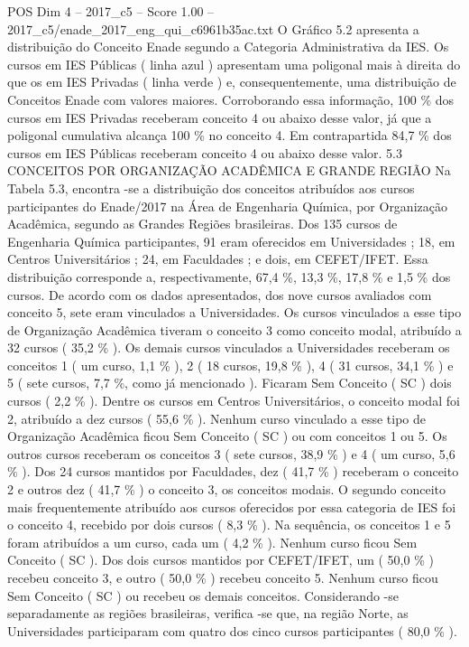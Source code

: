 \begin{textsample}{POS Dim 4 – 2017\_c5 – Score 1.00 – 2017\_c5/enade\_2017\_eng\_qui\_c6961b35ac.txt}
O Gráfico 5.2 apresenta a distribuição do Conceito Enade segundo a Categoria Administrativa da IES.
Os cursos em IES Públicas ( linha azul ) apresentam uma poligonal mais à direita do que os em IES Privadas ( linha verde ) e, consequentemente, uma distribuição de Conceitos Enade com valores maiores.
Corroborando essa informação, 100 \% dos cursos em IES Privadas receberam conceito 4 ou abaixo desse valor, já que a poligonal cumulativa alcança 100 \% no conceito 4.
Em contrapartida 84,7 \% dos cursos em IES Públicas receberam conceito 4 ou abaixo desse valor. 5.3 CONCEITOS POR ORGANIZAÇÃO ACADÊMICA E GRANDE REGIÃO Na Tabela 5.3, encontra -se a distribuição dos conceitos atribuídos aos cursos participantes do Enade/2017 na Área de Engenharia Química, por Organização Acadêmica, segundo as Grandes Regiões brasileiras.
Dos 135 cursos de Engenharia Química participantes, 91 eram oferecidos em Universidades ; 18, em Centros Universitários ; 24, em Faculdades ; e dois, em CEFET/IFET.
Essa distribuição corresponde a, respectivamente, 67,4 \%, 13,3 \%, 17,8 \% e 1,5 \% dos cursos.
De acordo com os dados apresentados, dos nove cursos avaliados com conceito 5, sete eram vinculados a Universidades.
Os cursos vinculados a esse tipo de Organização Acadêmica tiveram o conceito 3 como conceito modal, atribuído a 32 cursos ( 35,2 \% ).
Os demais cursos vinculados a Universidades receberam os conceitos 1 ( um curso, 1,1 \% ), 2 ( 18 cursos, 19,8 \% ), 4 ( 31 cursos, 34,1 \% ) e 5 ( sete cursos, 7,7 \%, como já mencionado ).
Ficaram Sem Conceito ( SC ) dois cursos ( 2,2 \% ).
Dentre os cursos em Centros Universitários, o conceito modal foi 2, atribuído a dez cursos ( 55,6 \% ).
Nenhum curso vinculado a esse tipo de Organização Acadêmica ficou Sem Conceito ( SC ) ou com conceitos 1 ou 5.
Os outros cursos receberam os conceitos 3 ( sete cursos, 38,9 \% ) e 4 ( um curso, 5,6 \% ).
Dos 24 cursos mantidos por Faculdades, dez ( 41,7 \% ) receberam o conceito 2 e outros dez ( 41,7 \% ) o conceito 3, os conceitos modais.
O segundo conceito mais frequentemente atribuído aos cursos oferecidos por essa categoria de IES foi o conceito 4, recebido por dois cursos ( 8,3 \% ).
Na sequência, os conceitos 1 e 5 foram atribuídos a um curso, cada um ( 4,2 \% ).
Nenhum curso ficou Sem Conceito ( SC ).
Dos dois cursos mantidos por CEFET/IFET, um ( 50,0 \% ) recebeu conceito 3, e outro ( 50,0 \% ) recebeu conceito 5.
Nenhum curso ficou Sem Conceito ( SC ) ou recebeu os demais conceitos.
Considerando -se separadamente as regiões brasileiras, verifica -se que, na região Norte, as Universidades participaram com quatro dos cinco cursos participantes ( 80,0 \% ).

\end{textsample}

